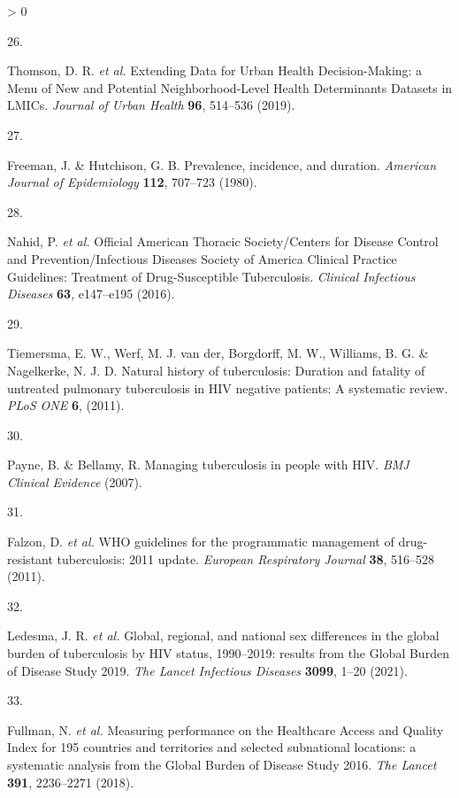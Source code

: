 \documentclass[
]{article}
\newlength{\cslhangindent}
\newlength{\csllabelwidth}
\newenvironment{CSLReferences}[2] %
 {%
  \setlength{\parindent}{0pt}
  \ifodd #1 \everypar{\setlength{\hangindent}{\cslhangindent}}\ignorespaces\fi
  \ifnum #2 > 0
  \setlength{\parskip}{#2\baselineskip}
  \fi
 }%
 {}
\newcommand{\CSLLeftMargin}[1]{\parbox[t]{\csllabelwidth}{#1}}
\newcommand{\CSLRightInline}[1]{\parbox[t]{\linewidth - \csllabelwidth}{#1}\break}
\begin{document}
\begin{CSLReferences}{0}{0}
\leavevmode\hypertarget{ref-Thomson2019}{}%
\CSLLeftMargin{26. }
\CSLRightInline{Thomson, D. R. \emph{et al.} {Extending Data for Urban Health Decision-Making: a Menu of New and Potential Neighborhood-Level Health Determinants Datasets in LMICs}. \emph{Journal of Urban Health} \textbf{96}, 514--536 (2019).}

\leavevmode\hypertarget{ref-Freeman1980}{}%
\CSLLeftMargin{27. }
\CSLRightInline{Freeman, J. \& Hutchison, G. B. {Prevalence, incidence, and duration}. \emph{American Journal of Epidemiology} \textbf{112}, 707--723 (1980).}

\leavevmode\hypertarget{ref-Nahid2016}{}%
\CSLLeftMargin{28. }
\CSLRightInline{Nahid, P. \emph{et al.} {Official American Thoracic Society/Centers for Disease Control and Prevention/Infectious Diseases Society of America Clinical Practice Guidelines: Treatment of Drug-Susceptible Tuberculosis}. \emph{Clinical Infectious Diseases} \textbf{63}, e147--e195 (2016).}

\leavevmode\hypertarget{ref-Tiemersma2011}{}%
\CSLLeftMargin{29. }
\CSLRightInline{Tiemersma, E. W., Werf, M. J. van der, Borgdorff, M. W., Williams, B. G. \& Nagelkerke, N. J. D. {Natural history of tuberculosis: Duration and fatality of untreated pulmonary tuberculosis in HIV negative patients: A systematic review}. \emph{PLoS ONE} \textbf{6}, (2011).}

\leavevmode\hypertarget{ref-Payne2007}{}%
\CSLLeftMargin{30. }
\CSLRightInline{Payne, B. \& Bellamy, R. {Managing tuberculosis in people with HIV}. \emph{BMJ Clinical Evidence} (2007).}

\leavevmode\hypertarget{ref-Falzon2011}{}%
\CSLLeftMargin{31. }
\CSLRightInline{Falzon, D. \emph{et al.} {WHO guidelines for the programmatic management of drug-resistant tuberculosis: 2011 update}. \emph{European Respiratory Journal} \textbf{38}, 516--528 (2011).}

\leavevmode\hypertarget{ref-Ledesma2021}{}%
\CSLLeftMargin{32. }
\CSLRightInline{Ledesma, J. R. \emph{et al.} {Global, regional, and national sex differences in the global burden of tuberculosis by HIV status, 1990--2019: results from the Global Burden of Disease Study 2019}. \emph{The Lancet Infectious Diseases} \textbf{3099}, 1--20 (2021).}

\leavevmode\hypertarget{ref-Fullman2018}{}%
\CSLLeftMargin{33. }
\CSLRightInline{Fullman, N. \emph{et al.} {Measuring performance on the Healthcare Access and Quality Index for 195 countries and territories and selected subnational locations: a systematic analysis from the Global Burden of Disease Study 2016}. \emph{The Lancet} \textbf{391}, 2236--2271 (2018).}


\end{CSLReferences}
\end{document}
